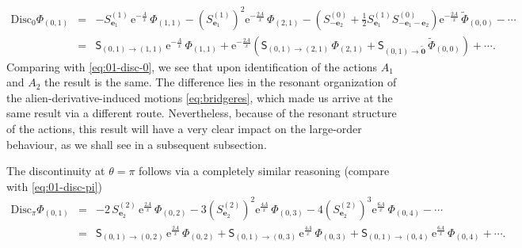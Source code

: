 \documentclass[11pt,a4paper]{article}
\def\disc{{\mathrm{Disc}}}
\begin{document}
%
\begin{eqnarray}
\disc_0 \Phi_{(0,1)} &=& - S^{(1)}_{\boldsymbol{e}_1}\, \mathrm{e}^{-\frac{A}{x}}\, \Phi_{(1,1)} - \left( S^{(1)}_{\boldsymbol{e}_1} \right)^2 \mathrm{e}^{-\frac{2A}{x}}\, \Phi_{(2,1)} - \left( S^{(0)}_{-\boldsymbol{e}_2}+\frac{1}{2} S^{(1)}_{\boldsymbol{e}_1} S^{(0)}_{-\boldsymbol{e}_1-\boldsymbol{e}_2} \right) \mathrm{e}^{-\frac{2A}{x}}\, \widetilde{\Phi}_{(0,0)} - \cdots \nonumber \\
\label{eq:01-disc-0-res}
&=& \mathsf{S}_{(0,1) \rightarrow (1,1)}\, \mathrm{e}^{-\frac{A}{x}}\, \Phi_{(1,1)} + \mathrm{e}^{-\frac{2A}{x}} \left( \mathsf{S}_{(0,1) \rightarrow (2,1)}\, \Phi_{(2,1)} + \mathsf{S}_{(0,1) \rightarrow \widetilde{\boldsymbol{0}}}\, \widetilde{\Phi}_{(0,0)} \right) + \cdots.
\end{eqnarray}
%
\noindent
Comparing with \eqref{eq:01-disc-0}, we see that upon identification of the actions $A_1$ and $A_2$ the result is the same. The difference lies in the resonant organization of the alien-derivative-induced motions \eqref{eq:bridgeres}, which made us arrive at the same result via a different route. Nevertheless, because of the resonant structure of the actions, this result will have a very clear impact on the large-order behaviour, as we shall see in a subsequent subsection.

The discontinuity at $\theta=\pi$ follows via a completely similar reasoning (compare with \eqref{eq:01-disc-pi})
%
\begin{eqnarray}
\disc_\pi \Phi_{(0,1)} &=& - 2\, S^{(2)}_{\boldsymbol{e}_2}\, \mathrm{e}^{\frac{2A}{x}}\, \Phi_{(0,2)} - 3 \left( S^{(2)}_{\boldsymbol{e}_2} \right)^2 \mathrm{e}^{\frac{4A}{x}}\, \Phi_{(0,3)} - 4 \left( S^{(2)}_{\boldsymbol{e}_2} \right)^3 \mathrm{e}^{\frac{6A}{x}}\, \Phi_{(0,4)} - \cdots \nonumber \\
\label{eq:01-disc-pi-res}
&=& \mathsf{S}_{(0,1) \rightarrow (0,2)}\, \mathrm{e}^{\frac{2A}{x}}\, \Phi_{(0,2)} + \mathsf{S}_{(0,1) \rightarrow (0,3)}\, \mathrm{e}^{\frac{4A}{x}}\, \Phi_{(0,3)} + \mathsf{S}_{(0,1) \rightarrow (0,4)}\, \mathrm{e}^{\frac{6A}{x}}\, \Phi_{(0,4)} + \cdots. \qquad\quad
\end{eqnarray}
\end{document}
